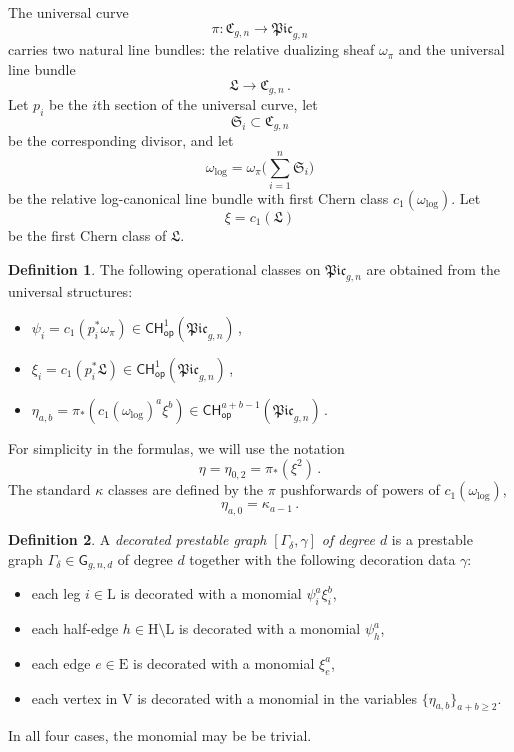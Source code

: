 \documentclass[a4paper,12pt]{article} %
\def\log{\mathrm{log}}
\def\E{\mathrm{E}}
\def\L{\mathrm{L}}
\def\V{\mathrm{V}}
\def\H{\mathrm{H}}
\def\G{\mathsf{G}}
\theoremstyle{definition}
\newtheorem{definition}{Definition} %
\theoremstyle{plain}%
\newcommand{\Picabs}{\mathfrak{Pic}}
\begin{document}
The universal curve $$\pi:\mathfrak{C}_{g,n} \to \Picabs_{g,n}$$ 
carries two natural line bundles: the relative dualizing sheaf $\omega_{\pi}$ 
and the universal line bundle
$$\mathfrak{L} \rightarrow \mathfrak{C}_{g,n}\, .$$
Let $p_i$ be the $i$th section of the universal curve, let 
$$\mathfrak{S}_i\subset \mathfrak{C}_{g,n}$$
be  the corresponding divisor, and let
$$\omega_\log = \omega_\pi\Big(\sum_{i=1}^n \mathfrak{S}_i\Big)$$ be the relative log-canonical line bundle 
with first Chern class $c_1 (\omega_\log)$. 
Let $$\xi = c_1(\mathfrak{L})$$ be the first Chern class of $\mathfrak{L}$.

\begin{definition} \label{Not:PsiXiEta}
The following operational classes on $\Picabs_{g,n}$ are obtained from the
universal structures:
\begin{itemize}
    \item $\psi_i = c_1(p_i^* \omega_\pi)\in \mathsf{CH}^1_{\mathsf{op}}(\Picabs_{g,n})\, $,
    \item $\xi_i = c_1(p_i^* \mathfrak{L})\in \mathsf{CH}^1_{\mathsf{op}}(\Picabs_{g,n})
    \, $,
    \item $\eta_{a,b} = \pi_*\left(c_1(\omega_\log)^a \xi^b\right)
    \in \mathsf{CH}^{a+b-1}_{\mathsf{op}}(\Picabs_{g,n})
    \, $.
\end{itemize}
\end{definition}
For simplicity in the formulas, 
we will use the
notation
$$\eta= \eta_{0,2} =\pi_*(\xi^2)\, .$$
The standard $\kappa$ classes are defined by the $\pi$ pushforwards
of powers of $c_1(\omega_\log)$, 
$$\eta_{a,0} = \kappa_{a-1}\, .$$

\begin{definition}
A {\em decorated prestable graph} $[\Gamma_\delta,\gamma]$ {\em of degree $d$} 
is a prestable graph $\Gamma_\delta \in \G_{g,n,d}$ of degree $d$ together with the following
decoration data $\gamma$:
\begin{itemize}
\item each leg $i\in \L$ is decorated with a monomial $\psi_i^a \xi_i^b$,
\item each half-edge $h\in \H\setminus \L$ is 
decorated with a monomial $\psi^a_h$,
\item each edge $e\in \E$ is decorated with a monomial $\xi^a_e$,
\item each vertex in $\V$ is decorated with a monomial in the variables 
$\{\eta_{a,b}\}_{a+b \geq 2}$.
\end{itemize}
In all four cases, the monomial may be be trivial.
\end{definition}
\end{document}
